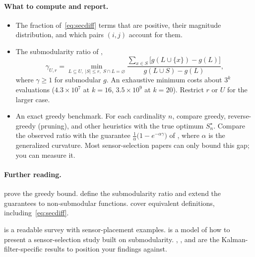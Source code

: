 \documentclass[11pt]{article}
\begin{document}
\paragraph{What to compute and report.}
\begin{itemize}[itemsep=2pt]
  \item The fraction of~\eqref{eq:secdiff} terms that are positive, their magnitude distribution, and which pairs $(i,j)$ account for them.
  \item The submodularity ratio of \textcite{DasKempe2011},
        \[
          \gamma_{U,r}=\min_{L\subseteq U,\;|S|\le r,\;S\cap L=\varnothing}
          \frac{\sum_{x\in S}\bigl[g(L\cup\{x\})-g(L)\bigr]}{g(L\cup S)-g(L)},
        \]
        where $\gamma\ge 1$ for submodular $g$.
        An exhaustive minimum costs about $3^k$ evaluations ($4.3\times10^7$ at $k=16$, $3.5\times10^9$ at $k=20$).
        Restrict $r$ or $U$ for the larger case.
  \item An exact greedy benchmark.
        For each cardinality $n$, compare greedy, reverse-greedy (pruning), and other heuristics with the true optimum $S_n^\star$.
        Compare the observed ratio with the guarantee $\frac{1}{\alpha}\bigl(1-e^{-\alpha\gamma}\bigr)$ of \textcite{Bian2017}, where $\alpha$ is the generalized curvature.
        Most sensor-selection papers can only bound this gap; you can measure it.
\end{itemize}

\paragraph{Further reading.}
\begin{reading}
  \item[Mathematics.] \textcite{Nemhauser1978} prove the greedy bound.
        \textcite{DasKempe2011} define the submodularity ratio and \textcite{Bian2017} extend the guarantees to non-submodular functions.
        \textcite[\S2, \S11]{Bach2013} cover equivalent definitions, including~\eqref{eq:secdiff}.
  \item[Applying it.] \textcite{KrauseGolovin2014} is a readable survey with sensor-placement examples.
        \textcite{Krause2008} is a model of how to present a sensor-selection study built on submodularity.
        \textcite{Shamaiah2010}, \textcite{Tzoumas2016}, and \textcite{Ye2018} are the Kalman-filter-specific results to position your findings against.
\end{reading}

\end{document}
